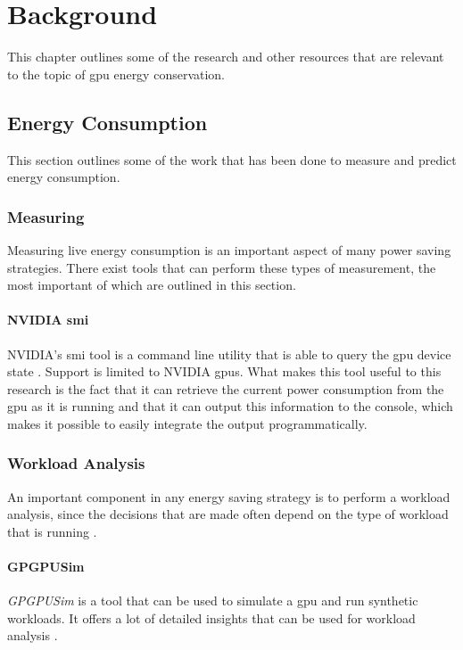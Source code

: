 \chapter{Background}
	This chapter outlines some of the research and other resources that are relevant to the topic of \gls{gpu} energy conservation.

	\section{Energy Consumption}
		This section outlines some of the work that has been done to measure and predict energy consumption.

		\subsection{Measuring}
			Measuring live energy consumption is an important aspect of many power saving strategies.
			There exist tools that can perform these types of measurement, the most important of which are outlined in this section.

			\subsubsection{NVIDIA \acrlong{smi}}
				NVIDIA's \gls{smi} tool is a command line utility that is able to query the \gls{gpu} device state \parencite{NVIDIA}.
				Support is limited to NVIDIA \glspl{gpu}.
				What makes this tool useful to this research is the fact that it can retrieve the current power consumption from the \gls{gpu} as it is running and that it can output this information to the console, which makes it possible to easily integrate the output programmatically.

		\subsection{Workload Analysis}
			An important component in any energy saving strategy is to perform a workload analysis, since the decisions that are made often depend on the type of workload that is running \parencite{Chen2011}.

			\subsubsection{GPGPUSim}
				\emph{GPGPUSim} is a tool that can be used to simulate a \gls{gpu} and run synthetic workloads.
				It offers a lot of detailed insights that can be used for workload analysis \parencite{Bakhoda2009}.


